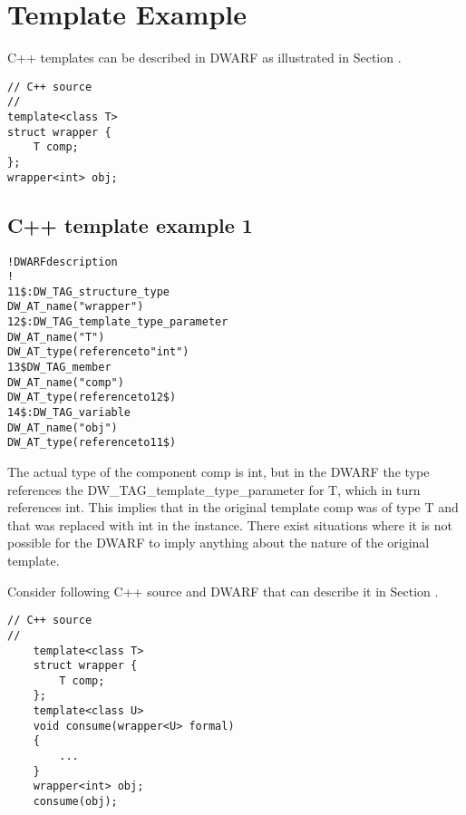 \section{Template Example}
\label{app:templateexample}

C++ templates can be described in DWARF as illustrated in 
Section .



\begin{lstlisting}
// C++ source
//
template<class T>
struct wrapper {
    T comp;
};
wrapper<int> obj;
\end{lstlisting}

\subsection{C++ template example 1}
\label{app:ctemplateexample1}
\begin{alltt}
! DWARF description
!
11\$: DW\_TAG\_structure\_type
        DW\_AT\_name("wrapper")
12\$: DW\_TAG\_template\_type\_parameter
        DW\_AT\_name("T")
        DW\_AT\_type(reference to "int")
13\$ DW\_TAG\_member
        DW\_AT\_name("comp")
        DW\_AT\_type(reference to 12\$)
14\$: DW\_TAG\_variable
        DW\_AT\_name("obj")
        DW\_AT\_type(reference to 11\$)
\end{alltt}

The actual type of the component comp is int, but in the DWARF
the type references the DW\_TAG\_template\_type\_parameter for
T, which in turn references int. This implies that in the
original template comp was of type T and that was replaced
with int in the instance.  There exist situations where it is
not possible for the DWARF to imply anything about the nature
of the original template. 

Consider following C++ source and DWARF 
that can describe it in
Section .


\begin{lstlisting}
// C++ source
//
    template<class T>
    struct wrapper {
        T comp;
    };
    template<class U>
    void consume(wrapper<U> formal)
    {
        ...
    }
    wrapper<int> obj;
    consume(obj);
\end{lstlisting}

